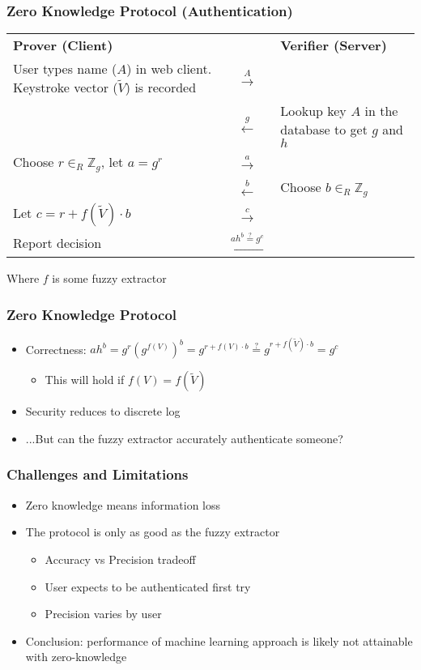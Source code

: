 \documentclass{beamer}
\begin{document}
\frame
{
  \frametitle{Zero Knowledge Protocol (Authentication)}

  \begin{center}
\begin{tabular}{m{1.5in}cm{1.5in}}
\textbf{Prover (Client)} && \textbf{Verifier (Server)}\\
User types name ($A$) in web client. Keystroke vector ($\tilde V$) is recorded &$\stackrel{A}{\longrightarrow}$ & \\
&$\stackrel{g}\longleftarrow$ & Lookup key $A$ in the database to get $g$ and $h$\\
Choose $r\in_R\mathbb{Z}_g$, let $a = g^r$ & $\stackrel{a}\longrightarrow$ & \\
& $\stackrel{b}\longleftarrow$ & Choose $b\in_R\mathbb{Z}_g$ \\
Let $c = r + f(\tilde V)\cdot b$ & $\stackrel{c}\longrightarrow$ & \\
Report decision & $\stackrel{ah^b \stackrel{?}{=} g^c}\longleftarrow$ &
\end{tabular}
\end{center}
Where $f$ is some fuzzy extractor
}

\frame
{
  \frametitle{Zero Knowledge Protocol}
  \begin{itemize}
    \item<1->Correctness: $ah^b = g^r(g^{f(V)})^b = g^{r+f(V)\cdot b} \stackrel?= g^{r+f(\tilde V)\cdot b} = g^c$
    \begin{itemize}
      \item<2-> This will hold if $f(V) = f(\tilde V)$
    \end{itemize}
    \item<3-> Security reduces to discrete log
    \item<4-> ...But can the fuzzy extractor accurately authenticate someone?
  \end{itemize}

}
\frame
{
  \frametitle{Challenges and Limitations}
  \begin{itemize}
    \item<1-> Zero knowledge means information loss  
    \item<2-> The protocol is only as good as the fuzzy extractor
    \begin{itemize}
      \item<3-> Accuracy vs Precision tradeoff
      \item<4-> User expects to be authenticated first try
      \item<5-> Precision varies by user
    \end{itemize}
    \item<6->Conclusion: performance of machine learning approach is likely not attainable with zero-knowledge
  \end{itemize}

}
\end{document}
